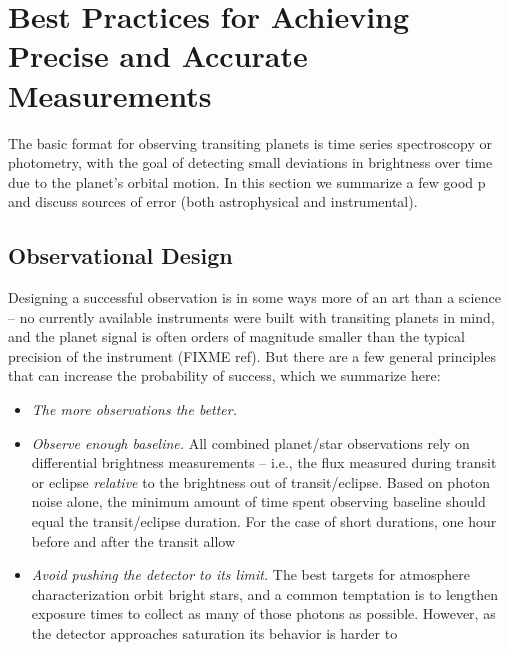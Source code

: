 \documentclass[graybox,natbib,nosecnum]{svmult}
\begin{document}


\section{Best Practices for Achieving Precise and Accurate Measurements}
The basic format for observing transiting planets is time series spectroscopy or photometry, with the goal of detecting small deviations in brightness over time due to the planet's orbital motion.  In this section we summarize a few good p and discuss sources of error (both astrophysical and instrumental).


\subsection{Observational Design}
Designing a successful observation is in some ways more of an art than a science -- no currently available instruments were built with transiting planets in mind, and the planet signal is often orders of magnitude smaller than the typical precision of the instrument (FIXME ref).  But there are a few general principles that can increase the probability of success, which we summarize here:

\begin{itemize}
\item{\emph{The more observations the better.}}
\item{\emph{Observe enough baseline.} All combined planet/star observations rely on differential brightness measurements -- i.e., the flux measured during transit or eclipse \emph{relative} to the brightness out of transit/eclipse. Based on photon noise alone, the minimum amount of time spent observing baseline should equal the transit/eclipse duration. For the case of short durations, one hour before and after the transit  allow }
\item{\emph{Avoid pushing the detector to its limit.} The best targets for atmosphere characterization orbit bright stars, and a common temptation is to lengthen exposure times to collect as many of those photons as possible. However, as the detector approaches saturation its behavior is harder to  }
\end{itemize}
\end{document}
